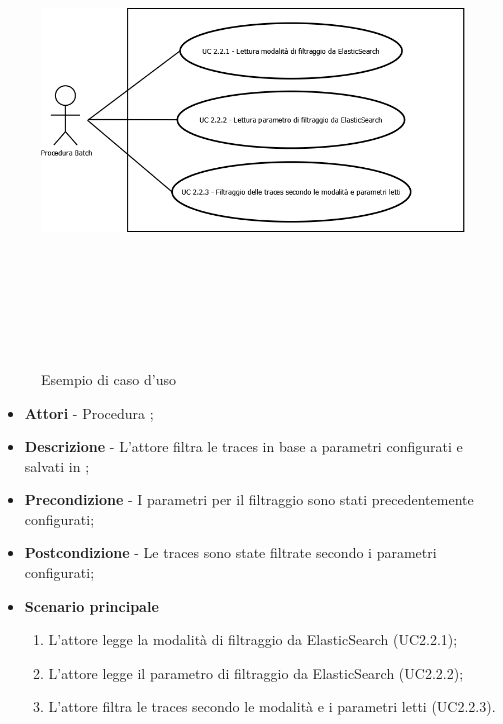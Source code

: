                 \begin{figure}[H]
                    \centering
                    \includegraphics[width=13cm,height=13cm,keepaspectratio]{./img/UC2_2.png}
                    \caption{Esempio di caso d'uso}
                \end{figure}

                \begin{itemize}

                    \item \textbf{Attori} - Procedura ;
                    \item \textbf{Descrizione} - L'attore filtra le traces in base a parametri configurati e salvati in ;
                    \item \textbf{Precondizione} - I parametri per il filtraggio sono stati precedentemente configurati;
                    \item \textbf{Postcondizione} - Le traces sono state filtrate secondo i parametri configurati;
                    \item \textbf{Scenario principale}
                        \begin{enumerate}

                            \item L'attore legge la modalità di filtraggio da ElasticSearch (UC2.2.1);
                            \item L'attore legge il parametro di filtraggio da ElasticSearch (UC2.2.2);
                            \item L'attore filtra le traces secondo le modalità e i parametri letti (UC2.2.3).

                        \end{enumerate}

                \end{itemize}

